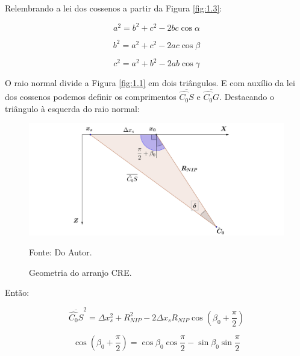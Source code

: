 \documentclass[a4paper, 12pt]{article}
\begin{document}
Relembrando a lei dos cossenos a partir da Figura \ref{fig:1.3}:

\begin{equation}
 \label{eq:1.7}
 a^2 = b^2 + c^2 - 2 b c \cos{\alpha}
\end{equation}

\begin{equation}
 \label{eq:1.8}
 b^2 = a^2 + c^2 - 2 a c \cos{\beta}
\end{equation}

\begin{equation}
 \label{eq:1.9}
 c^2 = a^2 + b^2 - 2 a b \cos{\gamma}
\end{equation}

O raio normal divide a Figura \ref{fig:1.1} em dois triângulos.
E com auxílio da lei dos cossenos podemos definir os comprimentos $\overline{\hat{C_0}S}$ e $\overline{\hat{C_0}G}$.
Destacando o triângulo à esquerda do raio normal:

\begin{figure}[H]
\caption{Geometria do arranjo CRE.}
\begin{center}
\includegraphics[scale=0.5]{images/Dir.png}
\vspace{-0.3cm}
\end{center}
\begin{center}
 Fonte: Do Autor.
\end{center}
\label{fig:1.4}
\end{figure}

Então:

\begin{equation}
 \label{eq:1.10}
 \overline{\hat{C_0}S}^2 = \Delta x_{s}^2 + R_{NIP}^2 - 2 \Delta x_s R_{NIP} 
 \cos{\left( \beta_0 + \frac{\pi}{2} \right)}
\end{equation}

\begin{equation}
 \label{eq:1.11}
 \cos{\left( \beta_0 + \frac{\pi}{2} \right)} 
 = \cos{\beta_0} \cos{\frac{\pi}{2}} - \sin{\beta_0} \sin{\frac{\pi}{2}}
\end{equation}
\end{document}
